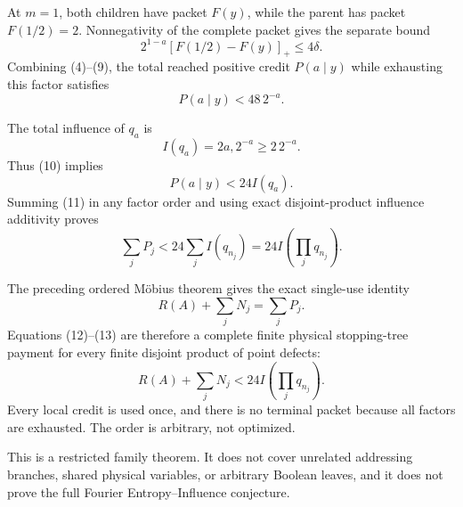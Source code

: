 At $m=1$, both children have packet $F(y)$, while the parent has packet
$F(1/2)=2$.  Nonnegativity of the complete packet gives the separate bound
\[
 2^{1-a}[F(1/2)-F(y)]_+\le4\delta.                                    \tag{9}
\]
Combining (4)--(9), the total reached positive credit $P(a\mid y)$ while
exhausting this factor satisfies
\[
 \boxed{P(a\mid y)<48\,2^{-a}.}                                      \tag{10}
\]

The total influence of $q_a$ is
\[
 I(q_a)=2a,2^{-a}\ge2\,2^{-a}.
\]
Thus (10) implies
\[
 P(a\mid y)<24I(q_a).                                                  \tag{11}
\]
Summing (11) in any factor order and using exact disjoint-product influence
additivity proves
\[
 \boxed{\sum_jP_j<24\sum_jI(q_{n_j})=24I\!\left(\prod_jq_{n_j}\right).}\tag{12}
\]

The preceding ordered M\"obius theorem gives the exact single-use identity
\[
 R(A)+\sum_jN_j=\sum_jP_j.                                             \tag{13}
\]
Equations (12)--(13) are therefore a complete finite physical stopping-tree
payment for every finite disjoint product of point defects:
\[
 \boxed{R(A)+\sum_jN_j<24I\!\left(\prod_jq_{n_j}\right).}              \tag{14}
\]
Every local credit is used once, and there is no terminal packet because all
factors are exhausted.  The order is arbitrary, not optimized.

This is a restricted family theorem.  It does not cover unrelated addressing
branches, shared physical variables, or arbitrary Boolean leaves, and it does
not prove the full Fourier Entropy--Influence conjecture.
